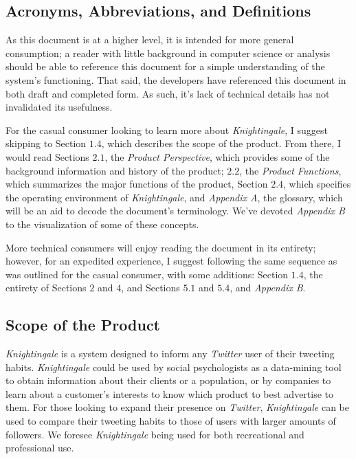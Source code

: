 \documentclass[a4paper, 12pt]{article}
\begin{document}
\subsection{Acronyms, Abbreviations, and Definitions} \label{sec:abbr}
\begin{adjustwidth}{2em}{0pt}
As this document is at a higher level, it is intended for more general consumption; a reader with little background in computer science or analysis should be able to reference this document for a simple understanding of the system’s functioning. That said, the developers have referenced this document in both draft and completed form. As such, it’s lack of technical details has not invalidated its usefulness. \newline

\noindent For the casual consumer looking to learn more about \textit{Knightingale}, I suggest skipping to Section $1.4$, which describes the scope of the product. From there, I would read Sections $2.1$, the \textit{Product Perspective}, which provides some of the background information and history of the product; $2.2$, the \textit{Product Functions}, which summarizes the major functions of the product, Section $2.4$, which specifies the operating environment of \textit{Knightingale}, and \textit{Appendix A}, the glossary, which will be an aid to decode the document’s terminology. We’ve devoted \textit{Appendix B} to the visualization of some of these concepts. \newline

\noindent More technical consumers will enjoy reading the document in its entirety; however, for an expedited experience, I suggest following the same sequence as was outlined for the casual consumer, with some additions: Section $1.4$, the entirety of Sections $2$ and $4$, and Sections $5.1$ and $5.4$, and \textit{Appendix B}. \newline
\end{adjustwidth}

\subsection{Scope of the Product} \label{sec:scope}
\begin{adjustwidth}{2em}{0pt}
\textit{Knightingale} is a system designed to inform any \textit{Twitter} user of their tweeting habits. \textit{Knightingale} could be used by social psychologists as a data-mining tool to obtain information about their clients or a population, or by companies to learn about a customer's interests to know which product to best advertise to them. For those looking to expand their presence on \textit{Twitter}, \textit{Knightingale} can be used to compare their tweeting habits to those of users with larger amounts of followers. We foresee \textit{Knightingale} being used for both recreational and professional use.
\end{adjustwidth}
\end{document}
